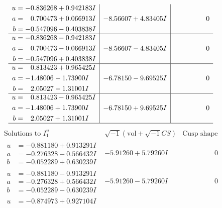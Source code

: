\documentclass[1p]{elsarticle_modified}
\theoremstyle{definition}
\newcommand{\I}{\sqrt{-1}}
\begin{document}
$$\begin{array}{c|c|c}
\begin{aligned}
u &= -0.836268 + 0.942183 I \\
a &= \phantom{-}0.700473 + 0.066913 I \\
b &= -0.547096 - 0.403838 I\end{aligned}
 & -8.56607 + 4.83405 I & \phantom{-0.000000 } 0 \\ \hline\begin{aligned}
u &= -0.836268 - 0.942183 I \\
a &= \phantom{-}0.700473 - 0.066913 I \\
b &= -0.547096 + 0.403838 I\end{aligned}
 & -8.56607 - 4.83405 I & \phantom{-0.000000 } 0 \\ \hline\begin{aligned}
u &= \phantom{-}0.813423 + 0.965425 I \\
a &= -1.48006 - 1.73900 I \\
b &= \phantom{-}2.05027 - 1.31001 I\end{aligned}
 & -6.78150 - 9.69525 I & \phantom{-0.000000 } 0 \\ \hline\begin{aligned}
u &= \phantom{-}0.813423 - 0.965425 I \\
a &= -1.48006 + 1.73900 I \\
b &= \phantom{-}2.05027 + 1.31001 I\end{aligned}
 & -6.78150 + 9.69525 I & \phantom{-0.000000 } 0\\
 \hline 
 \end{array}$$\newpage$$\begin{array}{c|c|c}  
\text{Solutions to }I^u_{1}& \I (\text{vol} + \sqrt{-1}CS) & \text{Cusp shape}\\
 \hline 
\begin{aligned}
u &= -0.881180 + 0.913291 I \\
a &= -0.276328 - 0.566432 I \\
b &= -0.052289 + 0.630239 I\end{aligned}
 & -5.91260 + 5.79260 I & \phantom{-0.000000 } 0 \\ \hline\begin{aligned}
u &= -0.881180 - 0.913291 I \\
a &= -0.276328 + 0.566432 I \\
b &= -0.052289 - 0.630239 I\end{aligned}
 & -5.91260 - 5.79260 I & \phantom{-0.000000 } 0 \\ \hline\begin{aligned}
u &= -0.874973 + 0.927104 I \\

\end{aligned}
\end{array}$$
\end{document}
